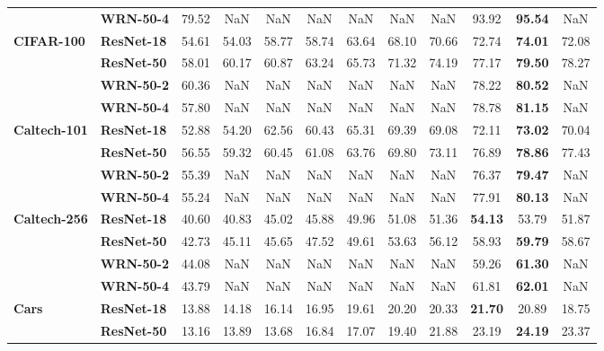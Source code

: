 \begin{table}
\begin{tabular}{l|l|cccccccccc}
       & \textbf{WRN-50-4} &             79.52 &   NaN &   NaN &   NaN &   NaN &   NaN &   NaN & 93.92 & \textbf{95.54} &   NaN \\
\cline{1-12}
\multirow{4}{*}{\textbf{CIFAR-100}} & \textbf{ResNet-18} &             54.61 & 54.03 & 58.77 & 58.74 & 63.64 & 68.10 & 70.66 & 72.74 & \textbf{74.01} & 72.08 \\
       & \textbf{ResNet-50} &             58.01 & 60.17 & 60.87 & 63.24 & 65.73 & 71.32 & 74.19 & 77.17 & \textbf{79.50} & 78.27 \\
       & \textbf{WRN-50-2} &             60.36 &   NaN &   NaN &   NaN &   NaN &   NaN &   NaN & 78.22 & \textbf{80.52} &   NaN \\
       & \textbf{WRN-50-4} &             57.80 &   NaN &   NaN &   NaN &   NaN &   NaN &   NaN & 78.78 & \textbf{81.15} &   NaN \\
\cline{1-12}
\multirow{4}{*}{\textbf{Caltech-101}} & \textbf{ResNet-18} &             52.88 & 54.20 & 62.56 & 60.43 & 65.31 & 69.39 & 69.08 & 72.11 & \textbf{73.02} & 70.04 \\
       & \textbf{ResNet-50} &             56.55 & 59.32 & 60.45 & 61.08 & 63.76 & 69.80 & 73.11 & 76.89 & \textbf{78.86} & 77.43 \\
       & \textbf{WRN-50-2} &             55.39 &   NaN &   NaN &   NaN &   NaN &   NaN &   NaN & 76.37 & \textbf{79.47} &   NaN \\
       & \textbf{WRN-50-4} &             55.24 &   NaN &   NaN &   NaN &   NaN &   NaN &   NaN & 77.91 & \textbf{80.13} &   NaN \\
\cline{1-12}
\multirow{4}{*}{\textbf{Caltech-256}} & \textbf{ResNet-18} &             40.60 & 40.83 & 45.02 & 45.88 & 49.96 & 51.08 & 51.36 & \textbf{54.13} & 53.79 & 51.87 \\
       & \textbf{ResNet-50} &             42.73 & 45.11 & 45.65 & 47.52 & 49.61 & 53.63 & 56.12 & 58.93 & \textbf{59.79} & 58.67 \\
       & \textbf{WRN-50-2} &             44.08 &   NaN &   NaN &   NaN &   NaN &   NaN &   NaN & 59.26 & \textbf{61.30} &   NaN \\
       & \textbf{WRN-50-4} &             43.79 &   NaN &   NaN &   NaN &   NaN &   NaN &   NaN & 61.81 & \textbf{62.01} &   NaN \\
\cline{1-12}
\multirow{4}{*}{\textbf{Cars}} & \textbf{ResNet-18} &             13.88 & 14.18 & 16.14 & 16.95 & 19.61 & 20.20 & 20.33 & \textbf{21.70} & 20.89 & 18.75 \\
       & \textbf{ResNet-50} &             13.16 & 13.89 & 13.68 & 16.84 & 17.07 & 19.40 & 21.88 & 23.19 & \textbf{24.19} & 23.37 \\

\end{tabular}
\end{table}

